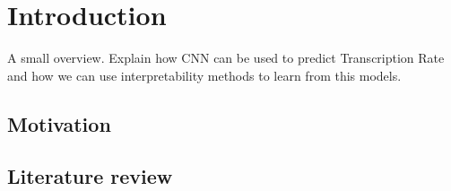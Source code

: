 \chapter{Introduction}
\label{ch:introduction}

A small overview. Explain how CNN can be used to predict Transcription Rate and how we can use interpretability methods to learn from this models.

\section{Motivation}
\label{sec:intro:motivation}

\section{Literature review}
\label{sec:intro:literature_review}


